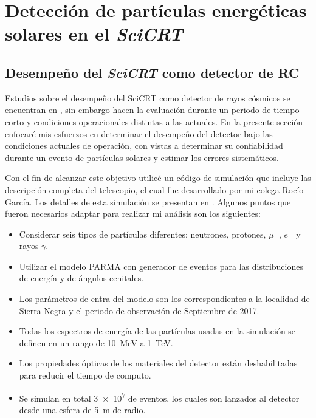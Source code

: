 
\chapter{Detección de partículas energéticas\\ solares en el \emph{SciCRT}}
\label{chap:cuatro}
\section{Desempeño del \emph{SciCRT} como detector de RC}

Estudios sobre el desempeño del SciCRT como detector de rayos cósmicos se encuentran en \cite{ynagai14,ysasai14}, sin embargo hacen la evaluación durante un periodo de tiempo corto y condiciones operacionales distintas a las actuales. En la presente sección enfocaré mis esfuerzos en determinar el desempeño del detector bajo las condiciones actuales de operación, con vistas a determinar su confiabilidad durante un evento de partículas solares y estimar los errores sistemáticos.

Con el fin de alcanzar este objetivo utilicé un código de simulación que incluye las descripción completa del telescopio, el cual fue desarrollado por mi colega Rocío García. Los detalles de esta simulación se presentan en \cite{garcia20}. Algunos puntos que fueron necesarios adaptar para realizar mi análisis son los siguientes:

\begin{itemize}
  \item Considerar seis tipos de partículas diferentes: neutrones, protones, $\mu^{\pm}$, $e^{\pm}$ y rayos $\gamma$.
  \item Utilizar el modelo PARMA con generador de eventos para las distribuciones de energía y de ángulos cenitales.
  \item Los parámetros de entra del modelo son los correspondientes a la localidad de Sierra Negra y el periodo de observación de Septiembre de \num{2017}.
  \item Todas los espectros de energía de las partículas usadas en la simulación se definen en un rango de \SI{10}{\mega\electronvolt} a \SI{1}{\tera\electronvolt}.
  \item Los propiedades ópticas de los materiales del detector están deshabilitadas para reducir el tiempo de computo.
  \item Se simulan en total \num{3e7} de eventos, los cuales son lanzados al detector desde una esfera de \SI{5}{\metre} de radio.
\end{itemize}

